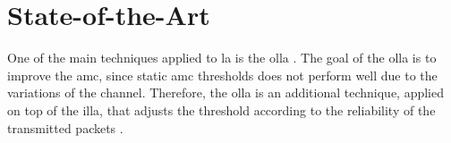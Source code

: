 %


%
%
%


\section{State-of-the-Art}

%

One of the main techniques applied to \gls{la} is the \gls{olla} \cite{Sampath1997}.
%
The goal of the \gls{olla} is to improve the \gls{amc}, since static \gls{amc} thresholds does not perform well due to the variations of the channel.
%
Therefore, the \gls{olla} is an additional technique, applied on top of the \gls{illa}, that adjusts the threshold according to the reliability of the transmitted packets \cite{Blanquez-Casado2016}.

